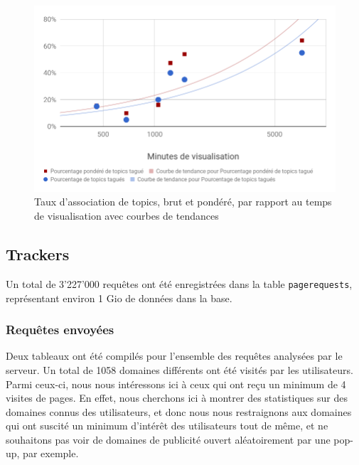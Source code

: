 			\begin{figure}[!h]
				\centering
				\includegraphics[height=0.7\textwidth]{images/results/chart-5}
				\caption{Taux d'association de topics, brut et pondéré, par rapport au temps de visualisation avec courbes de tendances}
				\label{chart-5}
			\end{figure}


\clearpage

	\subsection{Trackers}

		Un total de 3'227'000 requêtes ont été enregistrées dans la table \texttt{pagerequests}, représentant environ 1 Gio de données dans la base. 

		\subsubsection{Requêtes envoyées}

			Deux tableaux ont été compilés pour l'ensemble des requêtes analysées par le serveur. Un total de 1058 domaines différents ont été visités par les utilisateurs. Parmi ceux-ci, nous nous intéressons ici à ceux qui ont reçu un minimum de 4 visites de pages. En effet, nous cherchons ici à montrer des statistiques sur des domaines connus des utilisateurs, et donc nous nous restraignons aux domaines qui ont suscité un minimum d'intérêt des utilisateurs tout de même, et ne souhaitons pas voir de domaines de publicité ouvert aléatoirement par une pop-up, par exemple.

